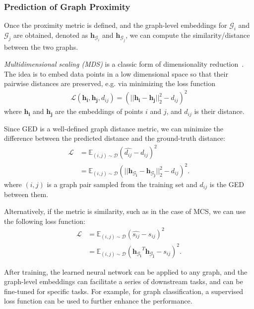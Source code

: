 \documentclass{article}
\newcommand\EE{\mathbb{E}}
\begin{document}
\subsubsection{Prediction of Graph Proximity}


Once the proximity metric is defined, and the graph-level embeddings for $\mathcal{G}_i$ and $\mathcal{G}_j$ are obtained, denoted as $\bm{h}_{\mathcal{G}_i}$ and $\bm{h}_{\mathcal{G}_j}$, we can compute the similarity/distance between the two graphs.

\emph{Multidimensional scaling (MDS)} is a classic form of dimensionality reduction~\cite{williams2001connection}. The idea is to embed data points in a low dimensional space so that their pairwise distances are preserved, e.g. via minimizing the loss function
\begin{align} 
\mathcal{L}(\bm{h_i},\bm{h_j},d_{ij}) = (||\bm{h_i} - \bm{h_j}||_{2}^2 - d_{ij})^2
\end{align}
where $\bm{h_i}$ and $\bm{h_j}$ are the embeddings of points $i$ and $j$, and $d_{ij}$ is their distance. 

Since GED is a well-defined graph distance metric, we can minimize the difference between the predicted distance and the ground-truth distance:
\begin{align} 
\mathcal{L} &=
\EE_{(i, j) \sim \mathcal{D}} (\hat{d_{ij}} - d_{ij})^{2} \\
&= \EE_{(i, j) \sim \mathcal{D}} ( ||\bm{h_{\mathcal{G}_i}} - \bm{h_{\mathcal{G}_j}}||_{2}^2 - d_{ij})^{2}.
\end{align}
where $(i,j)$ is a graph pair sampled from the training set and $d_{ij}$ is the GED between them. 


Alternatively, if the metric is similarity, such as in the case of MCS, we can use the following loss function:
\begin{align} 
\mathcal{L} &= \EE_{(i, j) \sim \mathcal{D}} (\hat{s_{ij}} - s_{ij})^{2} \\
&= \EE_{(i, j) \sim \mathcal{D}} (\bm{h_{\mathcal{G}_i}}^{T} \bm{h_{\mathcal{G}_j}} - s_{ij})^{2}.
\end{align}













After training, the learned neural network can be applied to any graph, and the graph-level embeddings can facilitate a series of downstream tasks, and can be fine-tuned for specific tasks. For example, for graph classification, a supervised loss function can be used to further enhance the performance. 
\end{document}
